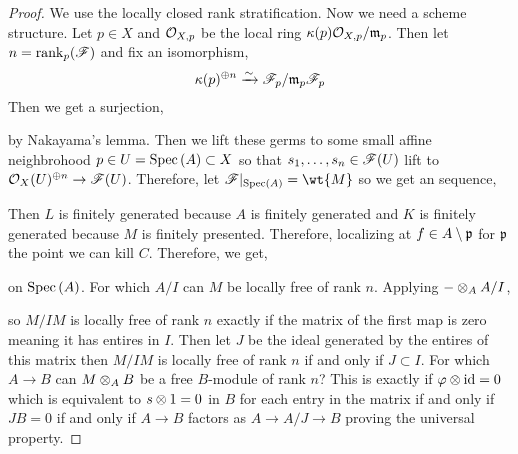 \documentclass[12pt]{article}
\begin{document}
\begin{proof}
We use the locally closed rank stratification. Now we need a scheme structure. Let $p \in X$ and $\mathcal{O}_{X, p}$ be the local ring $\kappa(p) \mathcal{O}_{X, p} / \mathfrak{m}_p$. Then let $n = \operatorname{\mathrm{rank}}_p(\mathscr{F})$ and fix an isomorphism,
\[ \kappa(p)^{\oplus n} \xrightarrow{\sim} \mathscr{F}_p / \mathfrak{m}_p \mathscr{F}_p \]
Then we get a surjection,
\begin{center}
\end{center}
by Nakayama's lemma. Then we lift these germs to some small affine neighbrohood $p \in U = \mathrm{Spec}\left( A \right) \subset X$ so that $s_1, \dots, s_n \in \mathscr{F}(U)$ lift to $\mathcal{O}_{X}(U)^{\oplus n} \to \mathscr{F}(U)$. Therefore, let $\F|_{\Spec{A}} = \wt{M}$ so we get an sequence,
\begin{center}
\end{center}
Then $L$ is finitely generated because $A$ is finitely generated and $K$ is finitely generated because $M$ is finitely presented. Therefore, localizing at $f \in A \setminus \mathfrak{p}$ for $\mathfrak{p}$ the point we can kill $C$. Therefore, we get,
\begin{center}
\end{center}
on $\mathrm{Spec}\left( A \right)$. For which $A/I$ can $M$ be locally free of rank $n$. Applying $- \otimes_A A / I$,
\begin{center}
\end{center}
so $M / IM$ is locally free of rank $n$ exactly if the matrix of the first map is zero meaning it has entires in $I$. Then let $J$ be the ideal generated by the entires of this matrix then $M/IM$ is locally free of rank $n$ if and only if $J \subset I$. For which $A \to B$ can $M \otimes_A B$ be a free $B$-module of rank $n$? This is exactly if $\varphi \otimes \mathrm{id} = 0$ which is equivalent to $s \otimes 1 = 0$ in $B$ for each entry in the matrix if and only if $J B = 0$ if and only if $A \to B$ factors as $A \to A / J \to B$ proving the universal property.
\end{proof}
\end{document}

